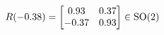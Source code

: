 \documentclass[preview]{standalone}
\begin{document}
\begin{align*}
\special{dvisvgm:raw <g id='unique000'>}R(-0.38) = \begin{bmatrix} 0.93 & 0.37 \\ -0.37 & 0.93 \end{bmatrix} \in \text{SO}(2)\special{dvisvgm:raw </g>}
\end{align*}
\end{document}
